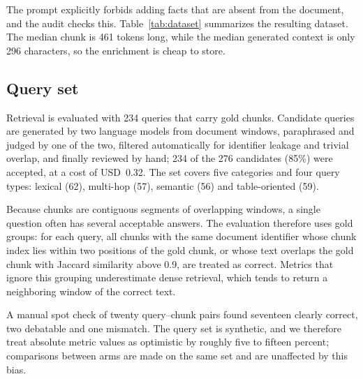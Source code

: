 The prompt explicitly forbids adding facts that are absent from the document,
and the audit checks this. Table~\ref{tab:dataset} summarizes the resulting
dataset. The median chunk is 461 tokens long, while the median generated
context is only 296 characters, so the enrichment is cheap to store.



\subsection{Query set}
\label{sec:queries}

Retrieval is evaluated with 234 queries that carry gold chunks. Candidate
queries are generated by two language models from document windows, paraphrased
and judged by one of the two, filtered automatically for identifier leakage and
trivial overlap, and finally reviewed by hand; 234 of the 276 candidates (85\%)
were accepted, at a cost of USD~0.32. The set covers five categories and four
query types: lexical (62), multi-hop (57), semantic (56) and table-oriented (59).

Because chunks are contiguous segments of overlapping windows, a single
question often has several acceptable answers. The evaluation therefore uses
gold groups: for each query, all chunks with the same document identifier whose
chunk index lies within two positions of the gold chunk, or whose text
overlaps the gold chunk with Jaccard similarity above 0.9, are treated as
correct. Metrics that ignore this grouping underestimate dense retrieval, which
tends to return a neighboring window of the correct text.

A manual spot check of twenty query--chunk pairs found seventeen clearly
correct, two debatable and one mismatch. The query set is synthetic, and we
therefore treat absolute metric values as optimistic by roughly five to fifteen
percent; comparisons between arms are made on the same set and are unaffected
by this bias.

